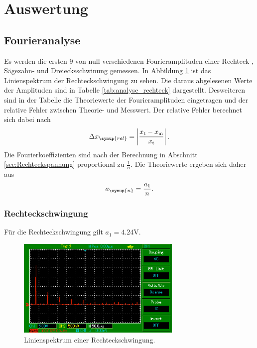 \section{Auswertung}
\label{sec:Auswertung}
\subsection{Fourieranalyse}
Es werden die ersten 9 von null verschiedenen Fourieramplituden einer Rechteck-,
Sägezahn- und Dreiecksschwinung gemessen.
In Abbildung \ref{fig:linienspektrum_rechteck} ist das Linienspektrum der
Rechteckschwingung zu sehen. Die daraus abgelesenen Werte der Amplituden sind in
Tabelle \ref{tab:analyse_rechteck} dargestellt. Desweiteren sind in der Tabelle
die Theoriewerte der Fourieramplituden eingetragen und der relative Fehler
zwischen Theorie- und Messwert.
Der relative Fehler berechnet sich dabei nach
\begin{equation}
  \Delta x_\symup{rel} = \left|\frac{x_\text{t} - x_\text{m}}
  {x_\text{t}} \right|.
  \label{eqn:relativer_fehler}
\end{equation}
Die Fourierkoeffizienten sind nach der Berechnung in Abschnitt \ref{sec:Rechteckspannung}
proportional zu $\frac{1}{n}$. Die Theoriewerte ergeben sich daher aus
\begin{equation}
  a_\symup{n} = \frac{a_1}{n}.
  \label{eqn:a_n_rechteck}
\end{equation}
\newpage
\subsubsection{Rechteckschwingung}
Für die Rechteckschwingung gilt $a_1 = 4.24 \si{\volt}$.
\begin{figure}
  \centering
  \includegraphics[width=0.7\textwidth]{linienspektrum_rechteck.png}
  \caption{Linienspektrum einer Rechteckschwingung.}
  \label{fig:linienspektrum_rechteck}
\end{figure}

